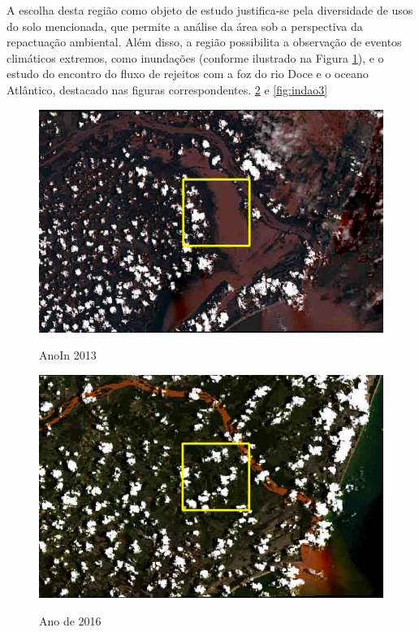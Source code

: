 	  \hspace*{1.25 cm} A escolha desta região como objeto de estudo justifica-se pela diversidade de usos do solo mencionada, que permite a análise da área sob a perspectiva da repactuação ambiental. Além disso, a região possibilita a observação de eventos climáticos extremos, como inundações (conforme ilustrado na Figura \ref{fig:indao}), e o estudo do encontro do fluxo de rejeitos com a foz do rio Doce e o oceano Atlântico, destacado nas figuras correspondentes. \ref{fig:indao2} e \ref{fig:indao3}\\  
				\begin{minipage}[t!]{0.33\textwidth}
					\begin{figure}[H]
						\centering \small \caption{AnoIn 2013}
						\includegraphics[width=0.97\linewidth]{FIGURAS/enche}
						\label{fig:indao} 
					\end{figure}			
				\end{minipage}\hfill
				\begin{minipage}[t!]{0.33\textwidth}
					\begin{figure}[H]
						\centering \small \caption{Ano de 2016}
						\includegraphics[width=0.97\linewidth]{FIGURAS/lamache1}
						\label{fig:indao2} 
					\end{figure}					
				\end{minipage} 
